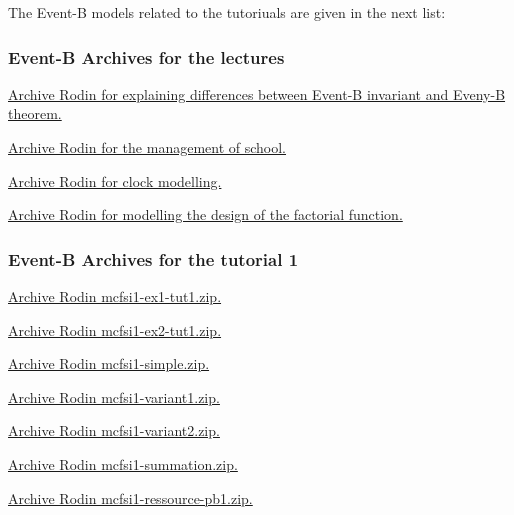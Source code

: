 \documentclass[ 12pt]{article}
\begin{document}
The Event-B models related to the tutoriuals are given in the next list: 

\subsubsection{Event-B Archives for the  lectures}

 \href{http://mery54.github.io/teaching/mosos/lecturesnotes/
   ex-safety.zip}{Archive Rodin  for  explaining differences between
   Event-B invariant and Eveny-B theorem. }


 
 \href{http://mery54.github.io/teaching/mosos/lecturesnotes/
   ex-school.zip}{Archive Rodin  for   the management of school. }

 
 
 \href{http://mery54.github.io/teaching/mosos/lecturesnotes/
   clock-tut0.zip}{Archive Rodin  for  clock modelling. }

  \href{http://mery54.github.io/teaching/mosos/lecturesnotes/factorial-plugin-tutO.zip}{Archive Rodin  for   modelling  the 
   design of the factorial function.}
  


 \subsubsection{Event-B Archives for   the tutorial 1}
\label{sec:event-b-archives}



\href{http://mery54.github.io/teaching/mosos/models/mcfsi1-ex1-tut1.zip}{Archive
  Rodin   mcfsi1-ex1-tut1.zip.}

\href{http://mery54.github.io/teaching/mosos/models/mcfsi1-ex1-tut1.zip}{Archive
  Rodin   mcfsi1-ex2-tut1.zip.}


\href{http://mery54.github.io/teaching/mosos/models/mcfsi1-simple.zip}{Archive 
  Rodin   mcfsi1-simple.zip.}

\href{http://mery54.github.io/teaching/mosos/models/mcfsi1-variant1.zip}{Archive 
  Rodin   mcfsi1-variant1.zip.}

\href{http://mery54.github.io/teaching/mosos/models/mcfsi1-variant2.zip}{Archive 
  Rodin   mcfsi1-variant2.zip.}


\href{http://mery54.github.io/teaching/mosos/models/mcfsi1-summation.zip}{Archive 
  Rodin   mcfsi1-summation.zip.}


\href{http://mery54.github.io/teaching/mosos/models/mcfsi1-ressource-pb1.zip}{Archive 
  Rodin   mcfsi1-ressource-pb1.zip.}
\end{document}
